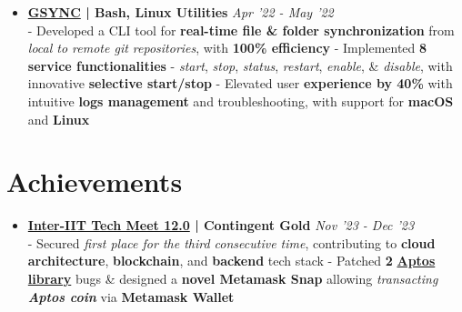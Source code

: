 \documentclass[a4paper,10pt]{extarticle} %
\begin{document}
\begin{itemize}[leftmargin=0.55cm, rightmargin=0.2cm, label={\Large\textbullet}]
\item \textbf{\href{https://github.com/proffapt/gsync}{GSYNC} | Bash, Linux Utilities} \hfill{\textit{Apr '22 - May '22}} \\
- Developed a CLI tool for \textbf{real-time file \& folder synchronization} from \textit{local to remote git repositories}, with \textbf{100\% efficiency} \newline
- Implemented \textbf{8 service functionalities} - \textit{start}, \textit{stop}, \textit{status}, \textit{restart}, \textit{enable}, \& \textit{disable}, with innovative \textbf{selective start/stop} \newline
- Elevated user \textbf{experience by 40\%} with intuitive \textbf{logs management} and troubleshooting, with support for \textbf{macOS} and \textbf{Linux}

\end{itemize}


 \vspace{0.2cm}
\section{\textcolor{primary}{Achievements}}
 \vspace{0.1cm}

\begin{itemize}[leftmargin=0.55cm, rightmargin=0.2cm, label={\Large\textbullet}]


 \item \textbf{\href{https://interiit-tech.org/}{Inter-IIT Tech Meet 12.0} | Contingent Gold} \hfill{\textit{Nov '23 - Dec '23}} \\
- Secured \textit{first place for the third consecutive time}, contributing to \textbf{cloud architecture}, \textbf{blockchain}, and \textbf{backend} tech stack \newline
- Patched \textbf{2} \href{https://github.com/aptos-labs/aptos-core}{\textbf{Aptos library}} bugs \& designed a \textbf{novel Metamask Snap} allowing \textit{transacting \textbf{Aptos coin}} via \textbf{Metamask Wallet}

\end{itemize}


\vspace{0.2cm}
\end{document}
